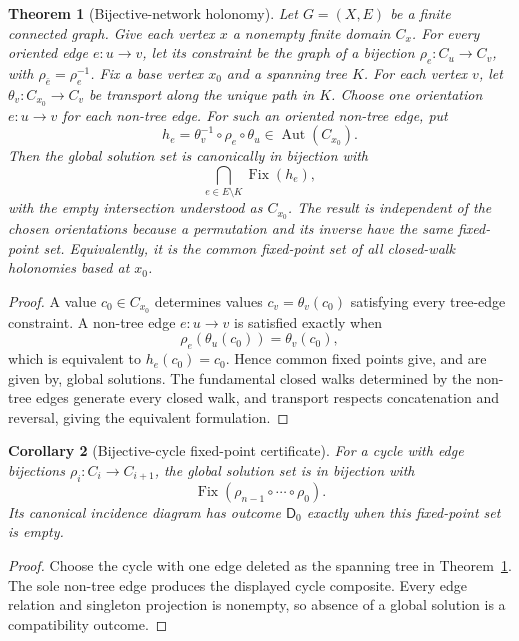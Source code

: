 \documentclass[11pt]{article}
\theoremstyle{plain}
\newtheorem{theorem}{Theorem}[section]
\newtheorem{corollary}[theorem]{Corollary}
\theoremstyle{definition}
\theoremstyle{remark}
\begin{document}
\begin{theorem}[Bijective-network holonomy]
\label{thm:network-holonomy}
Let $G=(X,E)$ be a finite connected graph. Give each vertex $x$ a nonempty
finite domain $C_x$. For every oriented edge $e:u\to v$, let its constraint be
the graph of a bijection $\rho_e:C_u\to C_v$, with
$\rho_{\bar e}=\rho_e^{-1}$. Fix a base vertex $x_0$ and a spanning tree $K$.
For each vertex $v$, let $\theta_v:C_{x_0}\to C_v$ be transport along the
unique path in $K$. Choose one orientation $e:u\to v$ for each non-tree edge. For such an oriented
non-tree edge, put
\[
h_e=\theta_v^{-1}\circ\rho_e\circ\theta_u
\in\operatorname{Aut}(C_{x_0}).
\]
Then the global solution set is canonically in bijection with
\[
\bigcap_{e\in E\setminus K}\operatorname{Fix}(h_e),
\]
with the empty intersection understood as $C_{x_0}$. The result is independent
of the chosen orientations because a permutation and its inverse have the same
fixed-point set. Equivalently, it is the common fixed-point set of all
closed-walk holonomies
based at $x_0$.
\end{theorem}

\begin{proof}
A value $c_0\in C_{x_0}$ determines values
$c_v=\theta_v(c_0)$ satisfying every tree-edge constraint. A non-tree edge
$e:u\to v$ is satisfied exactly when
\[
\rho_e(\theta_u(c_0))=\theta_v(c_0),
\]
which is equivalent to $h_e(c_0)=c_0$. Hence common fixed points give, and are
given by, global solutions. The fundamental closed walks determined by the
non-tree edges generate every closed walk, and transport respects concatenation
and reversal, giving the equivalent formulation.
\end{proof}

\begin{corollary}[Bijective-cycle fixed-point certificate]
\label{cor:cycle-holonomy}
For a cycle with edge bijections
$\rho_i:C_i\to C_{i+1}$, the global solution set is in bijection with
\[
\operatorname{Fix}(\rho_{n-1}\circ\cdots\circ\rho_0).
\]
Its canonical incidence diagram has outcome $\mathsf D_0$ exactly when this
fixed-point set is empty.
\end{corollary}

\begin{proof}
Choose the cycle with one edge deleted as the spanning tree in
Theorem~\ref{thm:network-holonomy}. The sole non-tree edge produces the displayed
cycle composite. Every edge relation and singleton projection is nonempty, so
absence of a global solution is a compatibility outcome.
\end{proof}
\end{document}
